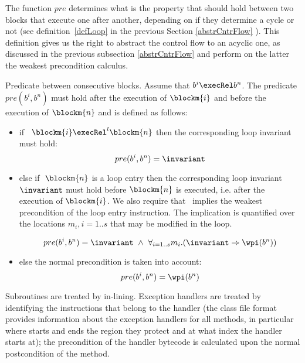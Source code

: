 The function  $pre$ determines what is the property that should hold between two blocks that execute one after another,
depending on if they determine a cycle or not (see definition~\ref{defLoop} in the previous Section \ref{abstrCntrFlow} ).  This definition
gives us the right to abstract the control flow to an acyclic one, as discussed in the previous subsection \ref{abstrCntrFlow} and perform on the latter the weakest precondition calculus.  

\begin{pre}

{Predicate between consecutive blocks.}\label{post2}
Assume that $b^i \execRel b^n$. The predicate $pre(b^{i}, b^{n})$ must hold after the execution of $\blockm{i}$ and before the execution of $\blockm{n}$ and is defined as follows:
\begin{itemize}
\item if \ $\blockm{i} \execRel^l \blockm{n}$ 
then the corresponding loop invariant must hold:
$$
pre(b^{i}, b^{n}) =  \invariant
$$

\item else if $\ \blockm{n}$ is a loop entry then the corresponding loop invariant $\invariant$ must hold before $\blockm{n}$ is executed, i.e. after the execution of $\blockm{i}$. We also require that \invariant \ implies the weakest precondition of the loop entry instruction. The implication is quantified over the locations $m_i , i= 1..s$ that may be modified in the loop.

$$
pre(b^{i}, b^{n}) = \invariant \ \wedge \ \forall_{i = 1..s} m_i.(
\invariant \Rightarrow \wpi(b^{n}))
$$
\item else the normal precondition is taken into account:
$$
pre(b^{i}, b^{n}) = \wpi(b^{n})
$$
\end{itemize}
\end{pre}

Subroutines are treated by in-lining. Exception handlers are 
treated by identifying the instructions that belong to the handler (the class file format provides information about the exception handlers for all methods, in particular where starts and ends the region 
they protect and at what index the handler starts at); the precondition of the handler bytecode is calculated upon the normal postcondition of the method.

